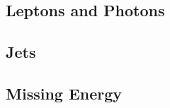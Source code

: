\subsection{Leptons and Photons}
\label{subsec:lepgamme}

\subsection{Jets}
\label{subsec:jets}

\subsection{Missing Energy}
\label{subsec:met}


